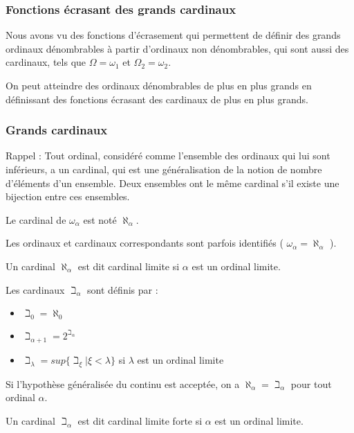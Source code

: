 \documentclass[12pt]{beamer}
\begin{document}
\begin{frame}
\frametitle{Fonctions écrasant des grands cardinaux}

Nous avons vu des fonctions d'écrasement qui permettent de définir des grands ordinaux dénombrables à partir d'ordinaux non dénombrables, qui sont aussi des cardinaux, tels que \( \Omega = \omega_1 \) et \( \Omega_2 = \omega_2 \). 

On peut atteindre des ordinaux dénombrables de plus en plus grands en définissant des fonctions écrasant des cardinaux de plus en plus grands.

\end{frame}
\begin{frame}
\frametitle{Grands cardinaux}

Rappel : Tout ordinal, considéré comme l'ensemble des ordinaux qui lui sont inférieurs, a un cardinal, qui est une généralisation de la notion de nombre d'éléments d'un ensemble. Deux ensembles ont le même cardinal s'il existe une bijection entre ces ensembles.

Le cardinal de \( \omega_\alpha \) est noté \( \aleph_\alpha \).

Les ordinaux et cardinaux correspondants sont parfois identifiés ( \( \omega_\alpha = \aleph_\alpha \) ).

Un cardinal \( \aleph_\alpha \) est dit cardinal limite si \( \alpha \) est un ordinal limite.

\end{frame}
\begin{frame}

Les cardinaux \( \beth_\alpha \) sont définis par :

\begin{itemize}
     \setlength{\itemsep}{1pt}
     \setlength{\parskip}{0pt}
     \setlength{\parsep}{0pt}
\item \( \beth_0 = \aleph_0 \)
\item \( \beth_{\alpha+1} = 2^{\beth_\alpha} \)
\item \( \beth_\lambda = sup \lbrace \beth_\xi | \xi < \lambda \rbrace \) si \( \lambda \) est un ordinal limite
\end{itemize}

Si l'hypothèse généralisée du continu est acceptée, on a \( \aleph_\alpha = \beth_\alpha \) pour tout ordinal \( \alpha \).

Un cardinal \( \beth_\alpha \) est dit cardinal limite forte si \( \alpha \) est un ordinal limite.

\end{frame}
\end{document}
